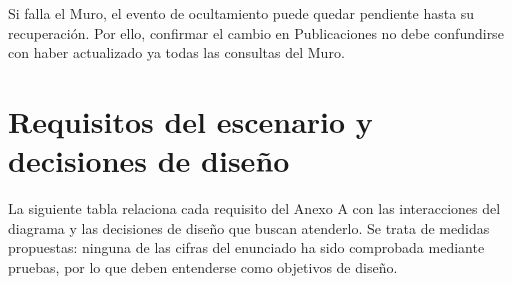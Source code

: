 \documentclass[12pt,a4paper]{article}
\begin{document}
Si falla el Muro, el evento de ocultamiento puede quedar
pendiente hasta su recuperación. Por ello, confirmar
el cambio en Publicaciones no debe confundirse con
haber actualizado ya todas las consultas del Muro.


\clearpage

\section{Requisitos del escenario y decisiones de diseño}

La siguiente tabla relaciona cada requisito del Anexo A con las interacciones
del diagrama y las decisiones de diseño que buscan atenderlo. Se trata de
medidas propuestas: ninguna de las cifras del enunciado ha sido comprobada
mediante pruebas, por lo que deben entenderse como objetivos de diseño.
\end{document}
